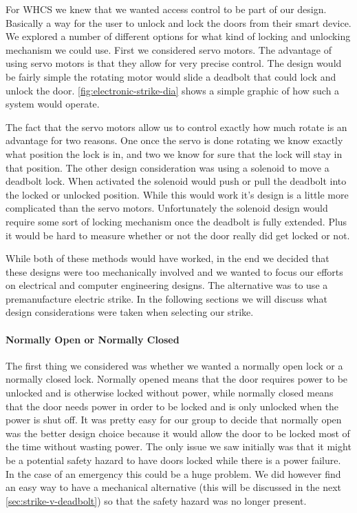 \label{sec:electronic-strike}

For WHCS we knew that we wanted access control to be part of our design.
Basically a way for the user to unlock and lock the doors from their smart
device. We explored a number of different options for what kind of locking and
unlocking mechanism we could use. First we considered servo motors. The
advantage of using servo motors is that they allow for very precise control.
The design would be fairly simple the rotating motor would slide a deadbolt
that could lock and unlock the door. \autoref{fig:electronic-strike-dia} shows a simple
graphic of how such a system would operate.

 
The fact that the servo motors allow us to control exactly how much rotate is
an advantage for two reasons. One once the servo is done rotating we know
exactly what position the lock is in, and two we know for sure that the lock
will stay in that position. The other design consideration was using a solenoid
to move a deadbolt lock. When activated the solenoid would push or pull the
deadbolt into the locked or unlocked position. While this would work it{}'s
design is a little more complicated than the servo motors. Unfortunately the
solenoid design would require some sort of locking mechanism once the deadbolt
is fully extended. Plus it would be hard to measure whether or not the door
really did get locked or not.

While both of these methods would have worked, in the end we decided that these
designs were too mechanically involved and we wanted to focus our efforts on
electrical and computer engineering designs. The alternative was to use a
premanufacture electric strike. In the following sections we will discuss what
design considerations were taken when selecting our strike.

\paragraph{Normally Open or Normally Closed}
The first thing we considered was whether we wanted a normally open lock or a
normally closed lock. Normally opened means that the door requires power to be
unlocked and is otherwise locked without power, while normally closed means
that the door needs power in order to be locked and is only unlocked when the
power is shut off. It was pretty easy for our group to decide that normally
open was the better design choice because it would allow the door to be locked
most of the time without wasting power. The only issue we saw initially was
that it might be a potential safety hazard to have doors locked while there is
a power failure. In the case of an emergency this could be a huge problem. We
did however find an easy way to have a mechanical alternative (this will be
discussed in the next \autoref{sec:strike-v-deadbolt}) so that the safety hazard was
no longer present.

